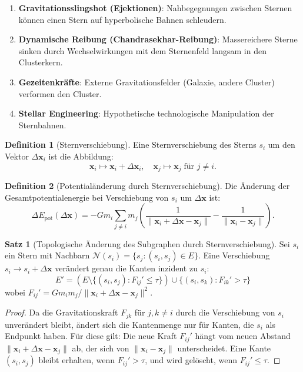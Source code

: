 ﻿\documentclass[a4paper,12pt]{report}
\theoremstyle{definition}
\newtheorem{definition}{Definition}
\newtheorem{satz}{Satz}
\begin{document}
\begin{enumerate}
    \item \textbf{Gravitationsslingshot (Ejektionen)}: Nahbegegnungen zwischen Sternen können einen Stern auf hyperbolische Bahnen schleudern.
    \item \textbf{Dynamische Reibung (Chandrasekhar-Reibung)}: Massereichere Sterne sinken durch Wechselwirkungen mit dem Sternenfeld langsam in den Clusterkern.
    \item \textbf{Gezeitenkräfte}: Externe Gravitationsfelder (Galaxie, andere Cluster) verformen den Cluster.
    \item \textbf{Stellar Engineering}: Hypothetische technologische Manipulation der Sternbahnen.
\end{enumerate}

\begin{definition}[Sternverschiebung]
Eine Sternverschiebung des Sterns $s_i$ um den Vektor $\Delta \mathbf{x}_i$ ist die Abbildung:
\[
\mathbf{x}_i \mapsto \mathbf{x}_i + \Delta \mathbf{x}_i, \quad \mathbf{x}_j \mapsto \mathbf{x}_j \; \text{für } j \neq i.
\]
\end{definition}

\begin{definition}[Potentialänderung durch Sternverschiebung]
Die Änderung der Gesamtpotentialenergie bei Verschiebung von $s_i$ um $\Delta \mathbf{x}$ ist:
\[
\Delta E_\mathrm{pot}(\Delta \mathbf{x}) = -G m_i \sum_{j \neq i} m_j \left( \frac{1}{\|\mathbf{x}_i + \Delta \mathbf{x} - \mathbf{x}_j\|} - \frac{1}{\|\mathbf{x}_i - \mathbf{x}_j\|} \right).
\]
\end{definition}

\begin{satz}[Topologische Änderung des Subgraphen durch Sternverschiebung]
\label{satz:topologie}
Sei $s_i$ ein Stern mit Nachbarn $\mathcal{N}(s_i) = \{s_j : (s_i, s_j) \in E\}$. Eine Verschiebung $s_i \to s_i + \Delta \mathbf{x}$ verändert genau die Kanten inzident zu $s_i$:
\[
E' = \left(E \setminus \{(s_i, s_j) : F_{ij}' \leq \tau\}\right) \cup \{(s_i, s_k) : F_{ik}' > \tau\}
\]
wobei $F_{ij}' = G m_i m_j / \|\mathbf{x}_i + \Delta \mathbf{x} - \mathbf{x}_j\|^2$.
\end{satz}

\begin{proof}
Da die Gravitationskraft $F_{jk}$ für $j, k \neq i$ durch die Verschiebung von $s_i$ unverändert bleibt, ändert sich die Kantenmenge nur für Kanten, die $s_i$ als Endpunkt haben. Für diese gilt: Die neue Kraft $F_{ij}'$ hängt vom neuen Abstand $\|\mathbf{x}_i + \Delta\mathbf{x} - \mathbf{x}_j\|$ ab, der sich von $\|\mathbf{x}_i - \mathbf{x}_j\|$ unterscheidet. Eine Kante $(s_i, s_j)$ bleibt erhalten, wenn $F_{ij}' > \tau$, und wird gelöscht, wenn $F_{ij}' \leq \tau$.
\end{proof}
\end{document}

